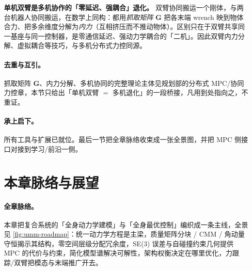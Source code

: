\begin{insight}
\textbf{单机双臂是多机协作的「零延迟、强耦合」退化。}\;
双臂协同搬运一个刚体，与两台机器人协同搬运，在数学上同构：都用\emph{抓取矩阵} $\mathbf G$ 把各末端 wrench 映到物体合力、把多余维度分解为\emph{内力}（互相挤压而不推动物体）。区别只在于双臂共享同一基座与同一控制器，是零通信延迟、强动力学耦合的「二机」。因此双臂内力分解、虚拟耦合等技巧，与多机分布式力控同源。
\end{insight}

\paragraph{去重与互引。}
抓取矩阵 $\mathbf G$、内力分解、多机协同的完整理论主体见规划部的分布式 MPC/协同力控章，本节只给出「单机双臂 $=$ 多机退化」的一段桥接，凡用到处指向之，不重证。

\paragraph{承上启下。}
所有工具与扩展已就位。最后一节把全章脉络收束成一张全景图，并把 MPC 侧接口对接到学习/前沿一侧。

\section{本章脉络与展望}
\label{sec:umm-outlook}

\paragraph{全章脉络。}
本章把复合系统的「全身动力学建模」与「全身最优控制」编织成一条主线，全景见 \cref{fig:umm-roadmap}：统一动力学方程是主梁，质量矩阵分块 / CMM / 角动量守恒揭示其结构，零空间层级分配冗余度，SE(3) 误差与自碰撞约束几何提供 MPC 的代价与约束，简化模型谱解决可解性，架构权衡决定在哪里优化，力跟踪/双臂把模态与末端推广开去。

